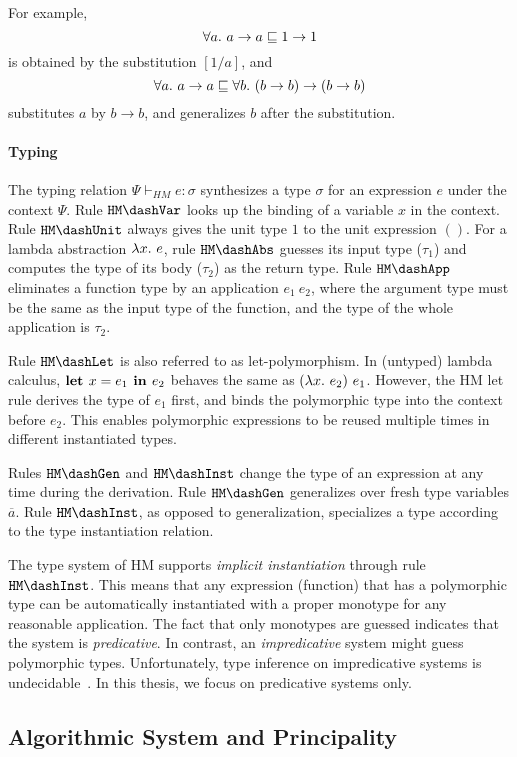 For example, $$\all a \to a \sqsubseteq 1 \to 1$$
is obtained by the substitution $[1/a]$, and
$$\all a \to a \sqsubseteq \all[b] (b \to b) \to (b \to b)$$
substitutes $a$ by $b \to b$, and generalizes $b$ after the substitution.


\paragraph{Typing}
The typing relation $\Psi \vdash_{HM} e:\sigma$ synthesizes a type $\sigma$ for
an expression $e$ under the context $\Psi$.
Rule $\mathtt{HM \dash Var}$ looks up the binding of a variable $x$ in the context.
Rule $\mathtt{HM \dash Unit}$ always gives the unit type $1$ to the unit expression $()$.
For a lambda abstraction $\lam e$, rule $\mathtt{HM \dash Abs}$ guesses its input type ($\tau_1$)
and computes the type of its body ($\tau_2$) as the return type.
Rule $\mathtt{HM \dash App}$ eliminates a function type by an application $e_1~e_2$,
where the argument type must be the same as the input type of the function,
and the type of the whole application is $\tau_2$.

Rule $\mathtt{HM \dash Let}$ is also referred to as let-polymorphism.
In (untyped) lambda calculus, $\textbf{let } x={e_1} \textbf{ in } {e_2}$ behaves the same as $(\lam e_2)~e_1$.
However, the HM let rule derives the type of $e_1$ first,
and binds the polymorphic type into the context before $e_2$.
This enables polymorphic expressions to be reused multiple times in different instantiated types.

Rules $\mathtt{HM \dash Gen}$ and $\mathtt{HM \dash Inst}$ change the type of an expression
at any time during the derivation.
Rule $\mathtt{HM \dash Gen}$ generalizes over fresh type variables $\overline{a}$.
Rule $\mathtt{HM \dash Inst}$, as opposed to generalization, specializes a type
according to the type instantiation relation.

The type system of HM supports \emph{implicit instantiation} through
rule $\mathtt{HM \dash Inst}$.
This means that any expression (function) that has a polymorphic type
can be automatically instantiated with a proper monotype for any reasonable application.
The fact that only monotypes are guessed indicates that the system is \emph{predicative}.
In contrast, an \emph{impredicative} system might guess polymorphic types.
Unfortunately, type inference on impredicative systems is undecidable~\citep{wells1999typability}.
In this thesis, we focus on predicative systems only.

\subsection{Algorithmic System and Principality}

